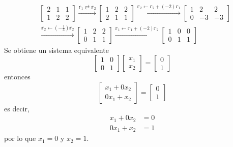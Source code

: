 \begin{example}
\begin{enumerate}
\begin{align*}
            & \left[ \begin{array}{cc|c}
                2 & 1 & 1 \\
                1 & 2 & 2
            \end{array} \right] \xrightarrow{\mathbb{r}_1 \rightleftarrows \mathbb{r}_2} \left[ \begin{array}{cc|c}
                1 & 2 & 2 \\
                2 & 1 & 1
            \end{array} \right] \xrightarrow{\mathbb{r}_2 \leftarrow \mathbb{r}_2 + (-2) \mathbb{r}_1} \left[ \begin{array}{rr|r}
                1 & 2 & 2 \\
                0 & -3 & -3
            \end{array} \right] \\
            & \xrightarrow{\mathbb{r}_2 \leftarrow (-\frac{1}{3})\mathbb{r}_2} \left[ \begin{array}{rr|r}
                1 & 2 & 2 \\
                0 & 1 & 1
            \end{array} \right] \xrightarrow{\mathbb{r}_1 \leftarrow \mathbb{r}_1 + (-2) \mathbb{r}_2} \left[ \begin{array}{rr|r}
                1 & 0 & 0 \\
                0 & 1 & 1
            \end{array} \right]
        \end{align*}
        Se obtiene un sistema equivalente
        $$\begin{bmatrix}
            1 & 0 \\
            0 & 1
        \end{bmatrix} \begin{bmatrix}
            x_1 \\
            x_2
        \end{bmatrix} = \begin{bmatrix}
            0 \\
            1
        \end{bmatrix}$$
        entonces
        $$\begin{bmatrix}
            x_1+0x_2 \\
            0x_1+x_2
        \end{bmatrix} = \begin{bmatrix}
            0 \\
            1
        \end{bmatrix}$$
        es decir,
        \begin{align*}
            x_1+0x_2 & = 0 \\
            0x_1+x_2 & = 1
        \end{align*}
        por lo que $x_1 = 0$ y $x_2 = 1$.
    \end{enumerate}
\end{example}

